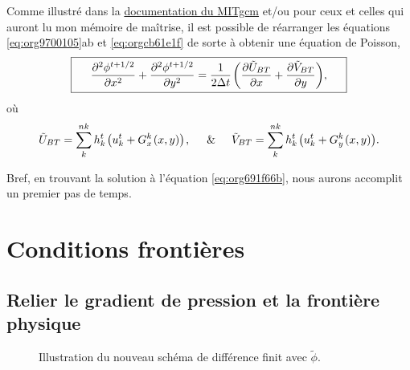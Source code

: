 \documentclass[10pt]{report}
\numberwithin{equation}{section}
\newcommand{\pt}{\hspace{1pt}} %
\begin{document}
Comme illustré dans la \href{http://mitgcm.org/public/r2\_manual/final/online\_documents/node33.html}{documentation du MITgcm} et/ou pour ceux et celles qui auront lu mon mémoire de maîtrise, il est possible de réarranger les équations \ref{eq:org9700105}ab et \ref{eq:orgcb61e1f} de sorte à obtenir une équation de Poisson,
\begin{equation}
\label{eq:org691f66b}
\boxed{\hspace{0.5cm} \pdv[2]{\phi^{t+1/2}}{x} + \pdv[2]{\phi^{t+1/2}}{y} = \frac{1}{2\Delta t}\pt \qty(\pdv{ \tilde{U}_{BT}}{x} + \pdv{\tilde{V}_{BT}}{y}),\hspace{0.5cm} }
\end{equation}
où
\begin{equation}
\tilde{U}_{BT} = \sum_k^{nk} h_k^t\pt \qty(u^t_k + G^k_x\pt(x,y))\pt,
\hspace{0.5cm}\&\hspace{0.5cm}
\tilde{V}_{BT} = \sum_k^{nk} h^t_k\pt \qty(u^t_k + G^k_y\pt(x,y)).
\end{equation}

Bref, en trouvant la solution à l'équation \ref{eq:org691f66b}, nous aurons accomplit un premier pas de temps. \newpage

\section{Conditions frontières}
\label{sec:org7de40ca}

\subsection{Relier le gradient de pression et la frontière physique}
\label{sec:orgfbaf6b7}

\begin{wrapfigure}[13]{r}{0.35\textwidth}
\vspace{-\baselineskip}
\centering
{}
\caption{\label{orgd07e92e}Illustration du nouveau schéma de différence finit avec \(\tilde{\phi}\).}
\end{wrapfigure}
\end{document}

